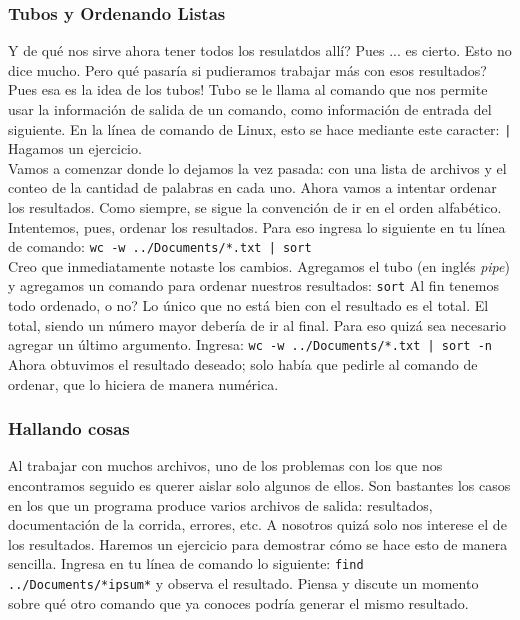 \documentclass[10pt,letterpaper]{article}
\newcommand{\inlinecode}[1]{
\colorbox{light-gray}{\texttt{#1}}
}
\begin{document}
\subsubsection{Tubos y Ordenando Listas}
Y de qu\'e nos sirve ahora tener todos los resulatdos all\'i? Pues ... es cierto. Esto no dice mucho. Pero qu\'e pasar\'ia si pudieramos trabajar m\'as con esos resultados? Pues esa es la idea de los tubos! Tubo se le llama al comando que nos permite usar la informaci\'on de salida de un comando, como informaci\'on de entrada del siguiente. En la l\'inea de comando de Linux, esto se hace mediante este caracter: \inlinecode{|} Hagamos un ejercicio.\\

Vamos a comenzar donde lo dejamos la vez pasada: con una lista de archivos y el conteo de la cantidad de palabras en cada uno. Ahora vamos a intentar ordenar los resultados. Como siempre, se sigue la convenci\'on de ir en el orden alfab\'etico. Intentemos, pues, ordenar los resultados. Para eso ingresa lo siguiente en tu l\'inea de comando: \inlinecode{wc -w ../Documents/*.txt | sort}\\

Creo que inmediatamente notaste los cambios. Agregamos el tubo (en ingl\'es \emph{pipe}) y agregamos un comando para ordenar nuestros resultados: \inlinecode{sort} Al fin tenemos todo ordenado, o no? Lo \'unico que no est\'a bien con el resultado es el total. El total, siendo un n\'umero mayor deber\'ia de ir al final. Para eso quiz\'a sea necesario agregar un \'ultimo argumento. Ingresa: \inlinecode{wc -w ../Documents/*.txt | sort -n} Ahora obtuvimos el resultado deseado; solo hab\'ia que pedirle al comando de ordenar, que lo hiciera de manera num\'erica.

\subsubsection{Hallando cosas}
Al trabajar con muchos archivos, uno de los problemas con los que nos encontramos seguido es querer aislar solo algunos de ellos. Son bastantes los casos en los que un programa produce varios archivos de salida: resultados, documentaci\'on de la corrida, errores, etc. A nosotros quiz\'a solo nos interese el de los resultados. Haremos un ejercicio para demostrar c\'omo se hace esto de manera sencilla. Ingresa en tu l\'inea de comando lo siguiente: \inlinecode{find ../Documents/*ipsum*} y observa el resultado. Piensa y discute un momento sobre qu\'e otro comando que ya conoces podr\'ia generar el mismo resultado.\\
\end{document}

